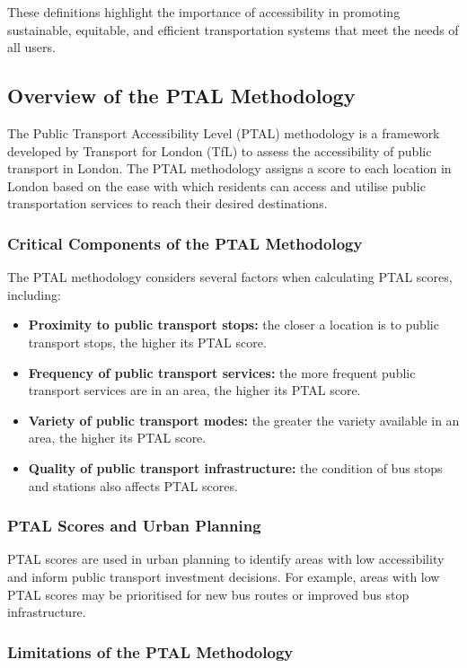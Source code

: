 \documentclass[11pt]{article}
\begin{document}
These definitions highlight the importance of accessibility in promoting sustainable, equitable,
and efficient transportation systems that meet the needs of all users.

\subsection{Overview of the PTAL Methodology}

The Public Transport Accessibility Level (PTAL) methodology is a framework developed by
Transport for London (TfL) to assess the accessibility of public transport in London. The PTAL
methodology assigns a score to each location in London based on the ease with which residents
can access and utilise public transportation services to reach their desired destinations.

\subsubsection{Critical Components of the PTAL Methodology}

The PTAL methodology considers several factors when calculating PTAL scores, including:
\begin{itemize}
  \item \textbf{Proximity to public transport stops:} the closer a location is to public
  transport stops, the higher its PTAL score.
  \item \textbf{Frequency of public transport services:} the more frequent public transport
  services are in an area, the higher its PTAL score.
  \item \textbf{Variety of public transport modes:} the greater the variety available in an
  area, the higher its PTAL score.
  \item \textbf{Quality of public transport infrastructure:} the condition of bus stops and
  stations also affects PTAL scores.
\end{itemize}

\subsubsection{PTAL Scores and Urban Planning}

PTAL scores are used in urban planning to identify areas with low accessibility and inform
public transport investment decisions. For example, areas with low PTAL scores may be
prioritised for new bus routes or improved bus stop infrastructure.

\subsubsection{Limitations of the PTAL Methodology}
\end{document}
